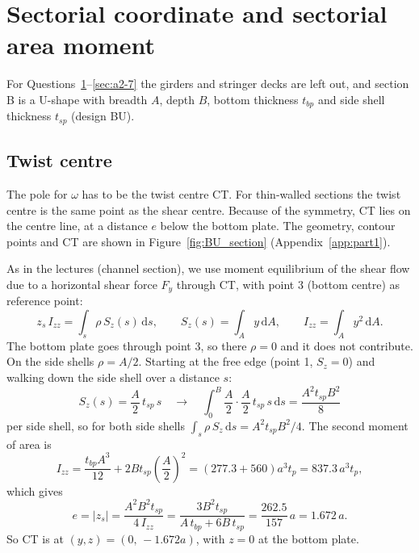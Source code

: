 
\section{Sectorial coordinate and sectorial area moment}
\label{sec:a2-5}

For Questions~\ref{sec:a2-5}--\ref{sec:a2-7} the girders and stringer decks are left out, and section B is a U-shape with breadth $A$, depth $B$, bottom thickness $t_{bp}$ and side shell thickness $t_{sp}$ (design BU).

\subsection{Twist centre}

The pole for $\omega$ has to be the twist centre CT. For thin-walled sections the twist centre is the same point as the shear centre. Because of the symmetry, CT lies on the centre line, at a distance $e$ below the bottom plate. The geometry, contour points and CT are shown in Figure~\ref{fig:BU_section} (Appendix~\ref{app:part1}).

As in the lectures (channel section), we use moment equilibrium of the shear flow due to a horizontal shear force $F_y$ through CT, with point 3 (bottom centre) as reference point:
\begin{equation}
    z_s\,I_{zz} = \int_s \rho\,S_z(s)\,\mathrm{d}s ,
    \qquad S_z(s) = \int_A y\,\mathrm{d}A ,
    \qquad I_{zz} = \int_A y^2\,\mathrm{d}A .
\end{equation}
The bottom plate goes through point 3, so there $\rho=0$ and it does not contribute. On the side shells $\rho = A/2$. Starting at the free edge (point 1, $S_z=0$) and walking down the side shell over a distance $s$:
\begin{equation}
    S_z(s) = \frac{A}{2}\,t_{sp}\,s
    \quad\rightarrow\quad
    \int_0^B \frac{A}{2}\cdot\frac{A}{2}\,t_{sp}\,s\,\mathrm{d}s = \frac{A^2t_{sp}B^2}{8}
\end{equation}
per side shell, so for both side shells $\int_s\rho\,S_z\,\mathrm{d}s = A^2t_{sp}B^2/4$. The second moment of area is
\begin{equation}
    I_{zz} = \frac{t_{bp}A^3}{12} + 2Bt_{sp}\left(\frac{A}{2}\right)^2
    = \left(277.3 + 560\right)a^3t_p = 837.3\,a^3t_p ,
\end{equation}
which gives
\begin{equation}
    e = |z_s| = \frac{A^2B^2t_{sp}}{4\,I_{zz}} = \frac{3B^2t_{sp}}{A\,t_{bp} + 6B\,t_{sp}}
      = \frac{262.5}{157}\,a = 1.672\,a .
\end{equation}
So CT is at $(y,z) = (0,\,-1.672a)$, with $z=0$ at the bottom plate.

